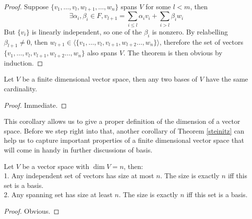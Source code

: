 \begin{proof}
    Suppose $\{v_1,\ldots,v_l,w_{l+1},\ldots,w_n\}$ spans $V$ for some $l<m$, then
    $$\exists\alpha_i,\beta_i\in F, v_{l+1}=\sum_{i\le l}\alpha_iv_i+\sum_{i>l}\beta_iw_i$$
    But $\{v_i\}$ is linearly independent, so one of the $\beta_i$ is nonzero.
    By relabelling $\beta_{l+1}\neq 0$, then $w_{l+1}\in\langle\{v_1,\ldots,v_l,v_{l+1},w_{l+2}\ldots,w_n\}\rangle$, therefore the set of vectors $\{v_1,\ldots,v_l,v_{l+1},w_{l+2}\ldots,w_n\}$ also spans $V$.
    The theorem is then obvious by induction.
\end{proof}
\begin{corollary}\label{dim_well_defined}
    Let $V$ be a finite dimensional vector space, then any two bases of $V$ have the same cardinality.
\end{corollary}
\begin{proof}
    Immediate.
\end{proof}
This corollary allows us to give a proper definition of the dimension of a vector space.
Before we step right into that, another corollary of Theorem \ref{steinitz} can help us to capture important properties of a finite dimensional vector space that will come in handy in further discussions of basis.
\begin{corollary}
    Let $V$ be a vector space with $\dim V=n$, then:\\
    1. Any independent set of vectors has size at most $n$.
    The size is exactly $n$ iff this set is a basis.\\
    2. Any spanning set has size at least $n$.
    The size is exactly $n$ iff this set is a basis.
\end{corollary}
\begin{proof}
    Obvious.
\end{proof}